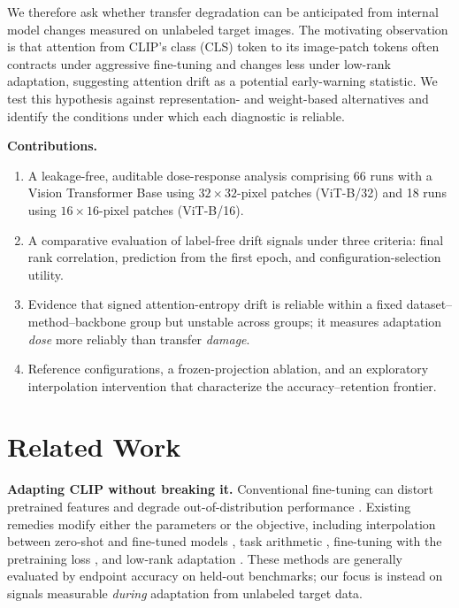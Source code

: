 \documentclass[conference]{IEEEtran}
\begin{document}
We therefore ask whether transfer degradation can be anticipated from internal model changes measured on unlabeled target images. The motivating observation is that attention from CLIP's class (CLS) token to its image-patch tokens often contracts under aggressive fine-tuning and changes less under low-rank adaptation, suggesting attention drift as a potential early-warning statistic. We test this hypothesis against representation- and weight-based alternatives and identify the conditions under which each diagnostic is reliable.

\textbf{Contributions.}
\begin{enumerate}
    \item A leakage-free, auditable dose-response analysis comprising 66 runs with a Vision Transformer Base using $32\!\times\!32$-pixel patches (ViT-B/32) and 18 runs using $16\!\times\!16$-pixel patches (ViT-B/16).
    \item A comparative evaluation of label-free drift signals under three criteria: final rank correlation, prediction from the first epoch, and configuration-selection utility.
    \item Evidence that signed attention-entropy drift is reliable within a fixed dataset--method--backbone group but unstable across groups; it measures adaptation \emph{dose} more reliably than transfer \emph{damage}.
    \item Reference configurations, a frozen-projection ablation, and an exploratory interpolation intervention that characterize the accuracy--retention frontier.
\end{enumerate}

\section{Related Work}
\textbf{Adapting CLIP without breaking it.}
Conventional fine-tuning can distort pretrained features and degrade out-of-distribution performance \cite{kumar2022finetuning}. Existing remedies modify either the parameters or the objective, including interpolation between zero-shot and fine-tuned models \cite{wortsman2022robust}, task arithmetic \cite{ilharco2023editing}, fine-tuning with the pretraining loss \cite{goyal2023finetune}, and low-rank adaptation \cite{hu2022lora}. These methods are generally evaluated by endpoint accuracy on held-out benchmarks; our focus is instead on signals measurable \emph{during} adaptation from unlabeled target data.
\end{document}
